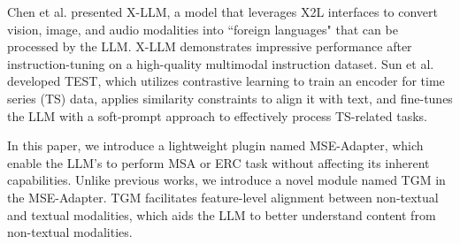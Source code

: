 	Chen et al.  presented X-LLM, a model that leverages X2L interfaces to convert vision, image, and audio modalities into ``foreign languages" that can be processed by the LLM. X-LLM demonstrates impressive performance after instruction-tuning on a high-quality multimodal instruction dataset.
	Sun et al.  developed TEST, which utilizes contrastive learning to train an encoder for time series (TS) data, applies similarity constraints to align it with text, and fine-tunes the LLM with a soft-prompt approach to effectively process TS-related tasks.
	
	In this paper, we introduce a lightweight plugin named MSE-Adapter, which enable the LLM's to perform MSA or ERC task without affecting its inherent capabilities. Unlike previous works, we introduce a novel module named TGM in the MSE-Adapter. TGM facilitates feature-level alignment between non-textual and textual modalities, which aids the LLM to better understand content from non-textual modalities.
